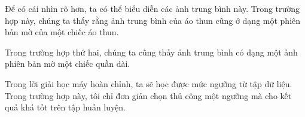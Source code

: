 \documentclass[letterpaper,11pt,english]{sphinxmanual}
\begin{document}
Để có cái nhìn rõ hơn, ta có thể biểu diễn các ảnh trung bình này. Trong
trường hợp này, chúng ta thấy rằng ảnh trung bình của áo thun cũng ở
dạng một phiên bản mờ của một chiếc áo thun.

\begin{sphinxVerbatim}[commandchars=\\\{\}]
  
\end{sphinxVerbatim}



Trong trường hợp thứ hai, chúng ta cũng thấy ảnh trung bình có dạng một
ảnh phiên bản mờ một chiếc quần dài.

\begin{sphinxVerbatim}[commandchars=\\\{\}]
  
\end{sphinxVerbatim}



Trong lời giải học máy hoàn chỉnh, ta sẽ học được mức ngưỡng từ tập dữ
liệu. Trong trường hợp này, tôi chỉ đơn giản chọn thủ công một ngưỡng mà
cho kết quả khá tốt trên tập huấn luyện.

\begin{sphinxVerbatim}[commandchars=\\\{\}]
    
     

   
\end{sphinxVerbatim}
\end{document}
